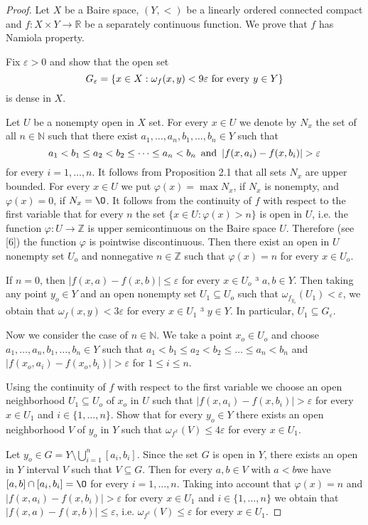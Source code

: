 \documentclass{amsart}
\begin{document}
\begin{proof} Let $X$ be a Baire space, $(Y,<)$ be a linearly ordered connected compact and $f:X\times Y\to\mathbb R$ be a separately continuous function. We prove that $f$ has Namiola property.

Fix $\varepsilon >0$ and show that the open set 
$$G_{\varepsilon}=\{x\in X: \omega_f(x,y)< 9 \varepsilon \mbox{\,\,for\,\,every}\,\,y\in Y\}$$
is dense in $X$.

Let $U$ be a nonempty open in $X$ set. For every $x\in U$ we denote by $N_x$ the set of all $n\in {\mathbb N}$ such that there exist  $a_1,\dots,a_n,b_1,\dots,b_n\in Y$ such that $$a_1<b_1\le a_2<b_2\le \dots\le a_n<b_n\,\,\,{\rm and}\,\,\,|f(x,a_i)-f(x,b_i)|>\varepsilon$$ for every $i=1,\dots,n$. It follows from Proposition 2.1 that all sets $N_x$ are upper bounded. For every $x\in U$ we put $\varphi(x)=\max N_x$, if $N_x$ is nonempty, and $\varphi(x)=0$, if $N_x=\O$. It follows from the continuity of $f$ with respect to the first variable that for every $n$ the set $\{x\in U:\varphi(x)>n\}$ is open in $U$, i.e. the function $\varphi:U\to {\mathbb Z}$ is upper semicontinuous on the Baire space $U$. Therefore (see [6]) the function $\varphi$ is pointwise discontinuous. Then there exist an open in $U$ nonempty set $U_o$ and nonnegative $n\in {\mathbb Z}$ such that $\varphi(x)=n$ for every $x\in U_o$.

If $n=0$, then $|f(x,a)-f(x,b)|\leq \varepsilon$ for every $x\in U_o$ ³ $a,b\in Y$. Then taking any point $y_o\in Y$ and an open nonempty set $U_1\subseteq U_o$ such that $\omega_{f_{y_o}}(U_1)<\varepsilon$, we obtain that $\omega_f(x,y)<3 \varepsilon$ for every $x\in U_1$ ³ $y\in Y$. In particular, $U_1\subseteq G_\varepsilon$.

Now we consider the case of $n\in \mathbb N$. We take a point $x_o\in U_o$ and choose $a_1,\dots,a_n,b_1,\dots,b_n\in Y$ such that $a_1<b_1\le a_2<b_2\le
\dots\le a_n<b_n$ and  $|f(x_o,a_i)-f(x_o,b_i)|>\varepsilon$ for $1\leq i\leq n$.

Using the continuity of $f$ with respect to the first variable we choose an open neighborhood $U_1\subseteq U_o$ of $x_o$ in $U$ such that $|f(x,a_i)-f(x,b_i)|>\varepsilon$ for every $x\in U_1$ and $i\in \{1,\dots, n\}$. Show that for every $y_o\in Y$ there exists an open neighborhood $V$ of $y_o$ in $Y$ such that $\omega_{f^x}(V)\leq 4\varepsilon$ for every $x\in U_1$.

Let $y_o\in G=Y\setminus \bigcup\limits^{n}_{i=1}[a_i,b_i]$. Since the set $G$ is open in $Y$, there exists an open in $Y$ interval $V$ such that $V\subseteq G$. Then for every $a,b\in V$ with  $a<b$we have $[a,b]\cap[a_i,b_i]=\O$ for every $i=1,\dots, n$. Taking into account that $\varphi(x)=n$ and $|f(x,a_i)-f(x,b_i)|>\varepsilon$ for every $x\in U_1$ and $i\in \{1,\dots, n\}$ we obtain that $|f(x,a)-f(x,b)|\leq \varepsilon$, i.e. $\omega_{f^x}(V)\leq \varepsilon$ for every $x\in U_1$.


\end{proof}
\end{document}
